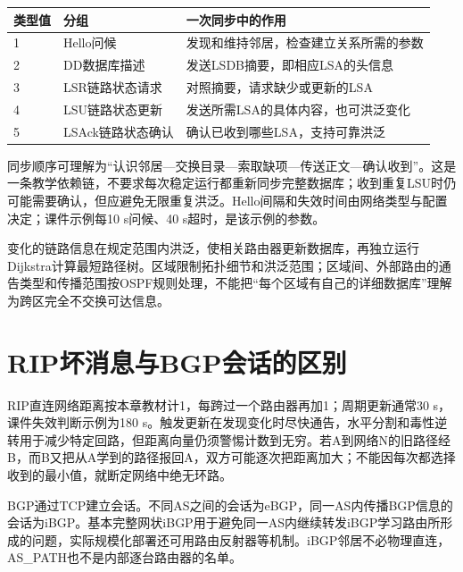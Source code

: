 \begin{wideblock}

\par\medskip\noindent\begin{minipage}{\linewidth}\fontsize{9.3}{12}\selectfont\begin{tabularx}{\linewidth}{@{}YYY@{}}
\toprule\noalign{}
类型值 & 分组 & 一次同步中的作用 \\
\midrule\noalign{}


1 & Hello问候 & 发现和维持邻居，检查建立关系所需的参数 \\
2 & DD数据库描述 & 发送LSDB摘要，即相应LSA的头信息 \\
3 & LSR链路状态请求 & 对照摘要，请求缺少或更新的LSA \\
4 & LSU链路状态更新 & 发送所需LSA的具体内容，也可洪泛变化 \\
5 & LSAck链路状态确认 & 确认已收到哪些LSA，支持可靠洪泛 \\
\bottomrule\end{tabularx}
\end{minipage}\par\medskip

\end{wideblock}

同步顺序可理解为``认识邻居---交换目录---索取缺项---传送正文---确认收到''。这是一条教学依赖链，不要求每次稳定运行都重新同步完整数据库；收到重复LSU时仍可能需要确认，但应避免无限重复洪泛。Hello间隔和失效时间由网络类型与配置决定；课件示例每10 s问候、40 s超时，是该示例的参数。

变化的链路信息在规定范围内洪泛，使相关路由器更新数据库，再独立运行Dijkstra计算最短路径树。区域限制拓扑细节和洪泛范围；区域间、外部路由的通告类型和传播范围按OSPF规则处理，不能把``每个区域有自己的详细数据库''理解为跨区完全不交换可达信息。

\section{RIP坏消息与BGP会话的区别}\label{CN04-course-routing}

RIP直连网络距离按本章教材计1，每跨过一个路由器再加1；周期更新通常30 s，课件失效判断示例为180 s。触发更新在发现变化时尽快通告，水平分割和毒性逆转用于减少特定回路，但距离向量仍须警惕计数到无穷。若A到网络N的旧路径经B，而B又把从A学到的路径报回A，双方可能逐次把距离加大；不能因每次都选择收到的最小值，就断定网络中绝无环路。

BGP通过TCP建立会话。不同AS之间的会话为eBGP，同一AS内传播BGP信息的会话为iBGP。基本完整网状iBGP用于避免同一AS内继续转发iBGP学习路由所形成的问题，实际规模化部署还可用路由反射器等机制。iBGP邻居不必物理直连，AS\_PATH也不是内部逐台路由器的名单。

